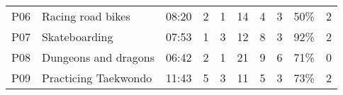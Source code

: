 \begin{table*}[t]
\begin{tabularx}{\textwidth}{p{0.5cm}p{3cm}p{1cm}p{1cm}p{1cm}p{1cm}p{1cm}p{1cm}p{1cm}p{1cm}}
P06         & Racing road bikes                                          & 08:20                                                                    & 2                                                                      & 1                                                                   & 14                                                            & 4                                                                    & 3                                                                      & 50\%                                                                          & 2                                                                        \\
P07         & Skateboarding                                                          & 07:53                                                                    & 1                                                                      & 3                                                                   & 12                                                            & 8                                                                    & 3                                                                      & 92\%                                                                          & 2                                                                        \\
P08         & Dungeons and dragons                                                   & 06:42                                                                    & 2                                                                      & 1                                                                   & 21                                                            & 9                                                                    & 6                                                                      & 71\%                                                                          & 0                                                                        \\
P09         & Practicing Taekwondo                                                   & 11:43                                                                    & 5                                                                      & 3                                                                   & 11                                                            & 5                                                                    & 3                                                                      & 73\%                                                                          & 2                                                                        \\

\end{tabularx}
\end{table*}
